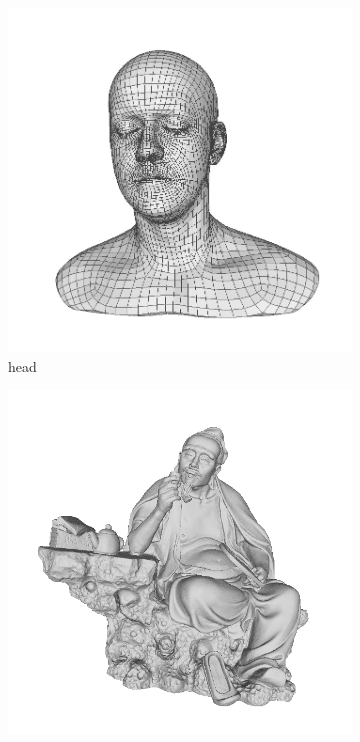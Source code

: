 \begin{figure}
	\begin{subfigure}[b]{0.23\linewidth}
		\includegraphics[width=\linewidth]{./Figures/train-dataset/28.head.png}
		\caption{head}
	\end{subfigure}
	\begin{subfigure}[b]{0.23\linewidth}
		\includegraphics[width=\linewidth]{./Figures/train-dataset/29.Lu-Yu.png}

\end{subfigure}
\end{figure}
